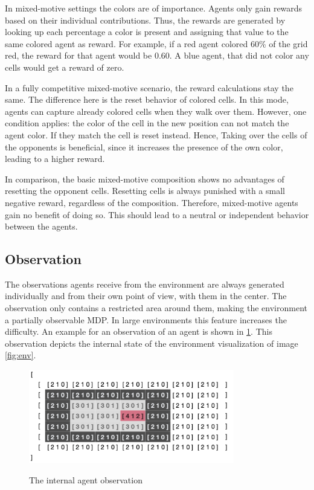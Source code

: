 In mixed-motive settings the colors are of importance. Agents only gain rewards based on their individual contributions. Thus, the rewards are generated by looking up each percentage a color is present and assigning that value to the same colored agent as reward. For example, if a red agent colored 60\% of the grid red, the reward for that agent would be 0.60. A blue agent, that did not color any cells would get a reward of zero.

In a fully competitive mixed-motive scenario, the reward calculations stay the same. The difference here is the reset behavior of colored cells. In this mode, agents can capture already colored cells when they walk over them. However, one condition applies: the color of the cell in the new position can not match the agent color. If they match the cell is reset instead. Hence, Taking over the cells of the opponents is beneficial, since it increases the presence of the own color, leading to a higher reward.

In comparison, the basic mixed-motive composition shows no advantages of resetting the opponent cells. Resetting cells is always punished with a small negative reward, regardless of the composition. Therefore, mixed-motive agents gain no benefit of doing so. This should lead to a neutral or independent behavior between the agents.

\subsection{Observation}
The observations agents receive from the environment are always generated individually and from their own point of view, with them in the center. The observation only contains a restricted area around them, making the environment a partially observable MDP. In large environments this feature increases the difficulty. An example for an observation of an agent is shown in \ref{fig:agent_obs}. This observation depicts the internal state of the environment visualization of image \ref{fig:env}.

\begin{figure}[hpbt]
    \centering
    \includegraphics[width=0.8\textwidth]{pictures/agent_observation}\\
    \caption[Agent Observation]{The internal agent observation}\label{fig:agent_obs}
\end{figure}

